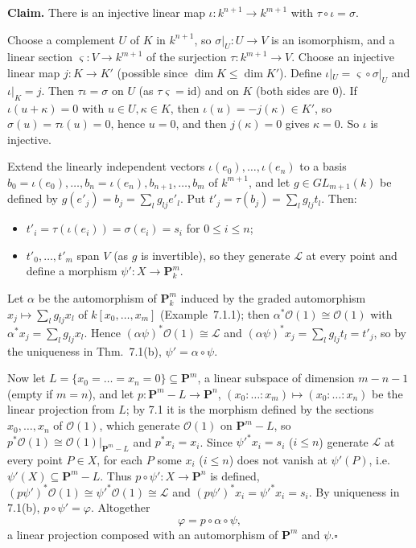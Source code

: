 \documentclass[11pt]{article}
\begin{document}
\textbf{Claim.} There is an injective linear map $\iota:k^{n+1}\to k^{m+1}$ with $\tau\circ\iota=\sigma$.

Choose a complement $U$ of $K$ in $k^{n+1}$, so $\sigma|_U:U\to V$ is an isomorphism, and a linear section $\varsigma:V\to k^{m+1}$ of the surjection $\tau:k^{m+1}\to V$. Choose an injective linear map $j:K\to K'$ (possible since $\dim K\le\dim K'$). Define $\iota|_U=\varsigma\circ\sigma|_U$ and $\iota|_K=j$. Then $\tau\iota=\sigma$ on $U$ (as $\tau\varsigma=\mathrm{id}$) and on $K$ (both sides are $0$). If $\iota(u+\kappa)=0$ with $u\in U,\kappa\in K$, then $\iota(u)=-j(\kappa)\in K'$, so $\sigma(u)=\tau\iota(u)=0$, hence $u=0$, and then $j(\kappa)=0$ gives $\kappa=0$. So $\iota$ is injective.

Extend the linearly independent vectors $\iota(e_0),\dots,\iota(e_n)$ to a basis $b_0=\iota(e_0),\dots,b_n=\iota(e_n),b_{n+1},\dots,b_m$ of $k^{m+1}$, and let $g\in GL_{m+1}(k)$ be defined by $g(e'_j)=b_j=\sum_l g_{lj}e'_l$. Put $t'_j=\tau(b_j)=\sum_l g_{lj}t_l$. Then:
\begin{itemize}
\item $t'_i=\tau(\iota(e_i))=\sigma(e_i)=s_i$ for $0\le i\le n$;
\item $t'_0,\dots,t'_m$ span $V$ (as $g$ is invertible), so they generate $\mathcal L$ at every point and define a morphism $\psi':X\to\mathbf P^m_k$.
\end{itemize}
Let $\alpha$ be the automorphism of $\mathbf P^m_k$ induced by the graded automorphism $x_j\mapsto\sum_l g_{lj}x_l$ of $k[x_0,\dots,x_m]$ (Example~7.1.1); then $\alpha^*\mathcal O(1)\cong\mathcal O(1)$ with $\alpha^*x_j=\sum_lg_{lj}x_l$. Hence $(\alpha\psi)^*\mathcal O(1)\cong\mathcal L$ and $(\alpha\psi)^*x_j=\sum_l g_{lj}t_l=t'_j$, so by the uniqueness in Thm.~7.1(b), $\psi'=\alpha\circ\psi$.

Now let $L=\{x_0=\dots=x_n=0\}\subseteq\mathbf P^m$, a linear subspace of dimension $m-n-1$ (empty if $m=n$), and let $p:\mathbf P^m-L\to\mathbf P^n$, $(x_0:\dots:x_m)\mapsto(x_0:\dots:x_n)$ be the linear projection from $L$; by 7.1 it is the morphism defined by the sections $x_0,\dots,x_n$ of $\mathcal O(1)$, which generate $\mathcal O(1)$ on $\mathbf P^m-L$, so $p^*\mathcal O(1)\cong\mathcal O(1)|_{\mathbf P^m-L}$ and $p^*x_i=x_i$. Since $\psi'^*x_i=s_i$ ($i\le n$) generate $\mathcal L$ at every point $P\in X$, for each $P$ some $x_i$ ($i\le n$) does not vanish at $\psi'(P)$, i.e.\ $\psi'(X)\subseteq\mathbf P^m-L$. Thus $p\circ\psi':X\to\mathbf P^n$ is defined, $(p\psi')^*\mathcal O(1)\cong\psi'^*\mathcal O(1)\cong\mathcal L$ and $(p\psi')^*x_i=\psi'^*x_i=s_i$. By uniqueness in 7.1(b), $p\circ\psi'=\varphi$. Altogether
\[
\varphi=p\circ\alpha\circ\psi ,
\]
a linear projection composed with an automorphism of $\mathbf P^m$ and $\psi$.\hfill$\square$
\end{document}
